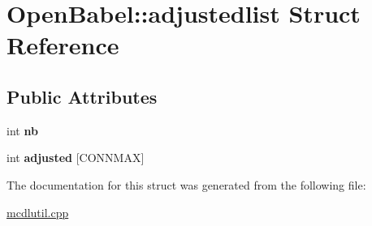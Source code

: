 \hypertarget{struct_open_babel_1_1adjustedlist}{\section{Open\-Babel\-:\-:adjustedlist Struct Reference}
\label{struct_open_babel_1_1adjustedlist}
}
\subsection*{Public Attributes}
\begin{DoxyCompactItemize}
\item 
\hypertarget{struct_open_babel_1_1adjustedlist_a2946a4774975843e43974ac481544e93}{int {\bfseries nb}}\label{struct_open_babel_1_1adjustedlist_a2946a4774975843e43974ac481544e93}

\item 
\hypertarget{struct_open_babel_1_1adjustedlist_a6cdd0fa0b1afe784a95a5d8e403434e9}{int {\bfseries adjusted} \mbox{[}C\-O\-N\-N\-M\-A\-X\mbox{]}}\label{struct_open_babel_1_1adjustedlist_a6cdd0fa0b1afe784a95a5d8e403434e9}

\end{DoxyCompactItemize}


The documentation for this struct was generated from the following file\-:\begin{DoxyCompactItemize}
\item 
\hyperlink{mcdlutil_8cpp}{mcdlutil.\-cpp}\end{DoxyCompactItemize}
